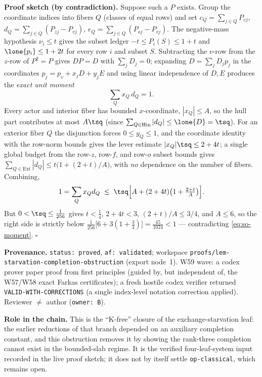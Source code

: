 \noindent\textbf{Proof sketch (by contradiction).} Suppose such a $P$ exists. Group the coordinate
indices into fibers $Q$ (classes of equal rows) and set $c_Q=\sum_{j\in Q}P_{vj}$,
$d_Q=\sum_{j\in Q}(P_{zj}-P_{vj})$, $e_Q=\sum_{j\in Q}(P_{oj}-P_{vj})$. The negative-mass hypothesis
$\nu_i\le t$ gives the subset ledger $-t\le P_i(S)\le1+t$ and $\lone{p_i}\le1+2t$ for every row $i$ and
subset $S$. Subtracting the $v$-row from the $z$-row of $P^2=P$ gives $DP=D$ with $\sum_j D_j=0$;
expanding $D=\sum_j D_j p_j$ in the coordinates $p_j=p_v+x_jD+y_jE$ and using linear independence of
$D,E$ produces the \emph{exact unit moment}
\begin{equation}\label{eq:so-moment}
  \sum_Q x_Q\,d_Q=1.
\end{equation}
Every actor and interior fiber has bounded $x$-coordinate, $|x_Q|\le A$, so the hull part contributes at
most $A\tsq$ (since $\sum_{Q\in\mathrm{Hin}}|d_Q|\le\lone{D}=\tsq$). For an exterior fiber $Q$ the
disjunction forces $0\le y_Q\le1$, and the coordinate identity with the row-norm bounds gives the lever
estimate $|x_Q|\tsq\le2+4t$; a single global budget from the row-$z$, row-$f$, and row-$o$ subset
bounds gives $\sum_{Q\in\mathrm{Ext}}|d_Q|\le t\bigl(1+(2+t)/A\bigr)$, with \emph{no} dependence on the
number of fibers. Combining,
\[
  1=\sum_Q x_Q d_Q\;\le\;\tsq\Bigl[A+(2+4t)\bigl(1+\tfrac{2+t}{A}\bigr)\Bigr].
\]
But $0<\tsq\le\tfrac1{256}$ gives $t<\tfrac14$, $2+4t<3$, $(2+t)/A\le3/4$, and $A\le6$, so the right
side is strictly below $\tfrac1{256}\bigl[6+3(1+\tfrac34)\bigr]=\tfrac{45}{1024}<1$ --- contradicting
\eqref{eq:so-moment}. \hfill$\square$

\noindent\textbf{Provenance.} \texttt{status: proved}, \texttt{af: validated}; workspace
\texttt{proofs/lem-starvation-completion-obstruction} (export node~1). W59 wave: a codex prover paper
proof from first principles (guided by, but independent of, the W57/W58 exact Farkas certificates); a
fresh hostile codex verifier returned \texttt{VALID-WITH-CORRECTIONS} (a single index-level notation
correction applied). Reviewer $\neq$ author (\texttt{owner: B}).

\noindent\textbf{Role in the chain.} This is the ``K-free'' closure of the exchange-starvation leaf: the
earlier reductions of that branch depended on an auxiliary completion constant, and this obstruction
removes it by showing the rank-three completion cannot exist in the bounded-slab regime. It is the
verified four-leaf-system input recorded in the live proof sketch; it does not by itself settle
\texttt{op-classical}, which remains open.
